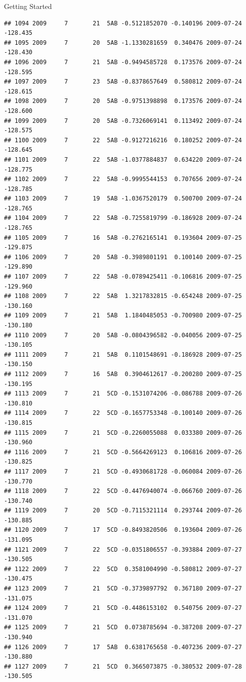 \documentclass[
  ignorenonframetext,
]{beamer}
\begin{document}
\begin{frame}[fragile]{Getting Started}
\begin{verbatim}
## 1094 2009     7       21  5AB -0.5121852070 -0.140196 2009-07-24 -128.435
## 1095 2009     7       20  5AB -1.1330281659  0.340476 2009-07-24 -128.430
## 1096 2009     7       21  5AB -0.9494585728  0.173576 2009-07-24 -128.595
## 1097 2009     7       23  5AB -0.8378657649  0.580812 2009-07-24 -128.615
## 1098 2009     7       20  5AB -0.9751398898  0.173576 2009-07-24 -128.600
## 1099 2009     7       20  5AB -0.7326069141  0.113492 2009-07-24 -128.575
## 1100 2009     7       22  5AB -0.9127216216  0.180252 2009-07-24 -128.645
## 1101 2009     7       22  5AB -1.0377884837  0.634220 2009-07-24 -128.775
## 1102 2009     7       22  5AB -0.9995544153  0.707656 2009-07-24 -128.785
## 1103 2009     7       19  5AB -1.0367520179  0.500700 2009-07-24 -128.765
## 1104 2009     7       22  5AB -0.7255819799 -0.186928 2009-07-24 -128.765
## 1105 2009     7       16  5AB -0.2762165141  0.193604 2009-07-25 -129.875
## 1106 2009     7       20  5AB -0.3989801191  0.100140 2009-07-25 -129.890
## 1107 2009     7       22  5AB -0.0789425411 -0.106816 2009-07-25 -129.960
## 1108 2009     7       22  5AB  1.3217832815 -0.654248 2009-07-25 -130.160
## 1109 2009     7       21  5AB  1.1840485053 -0.700980 2009-07-25 -130.180
## 1110 2009     7       20  5AB -0.0804396582 -0.040056 2009-07-25 -130.105
## 1111 2009     7       21  5AB  0.1101548691 -0.186928 2009-07-25 -130.150
## 1112 2009     7       16  5AB  0.3904612617 -0.200280 2009-07-25 -130.195
## 1113 2009     7       21  5CD -0.1531074206 -0.086788 2009-07-26 -130.810
## 1114 2009     7       22  5CD -0.1657753348 -0.100140 2009-07-26 -130.815
## 1115 2009     7       21  5CD -0.2260055088  0.033380 2009-07-26 -130.960
## 1116 2009     7       21  5CD -0.5664269123  0.106816 2009-07-26 -130.825
## 1117 2009     7       21  5CD -0.4930681728 -0.060084 2009-07-26 -130.770
## 1118 2009     7       22  5CD -0.4476940074 -0.066760 2009-07-26 -130.740
## 1119 2009     7       20  5CD -0.7115321114  0.293744 2009-07-26 -130.885
## 1120 2009     7       17  5CD -0.8493820506  0.193604 2009-07-26 -131.095
## 1121 2009     7       22  5CD -0.0351806557 -0.393884 2009-07-27 -130.505
## 1122 2009     7       22  5CD  0.3581004990 -0.580812 2009-07-27 -130.475
## 1123 2009     7       21  5CD -0.3739897792  0.367180 2009-07-27 -131.075
## 1124 2009     7       21  5CD -0.4486153102  0.540756 2009-07-27 -131.070
## 1125 2009     7       21  5CD  0.0738785694 -0.387208 2009-07-27 -130.940
## 1126 2009     7       17  5AB  0.6381765658 -0.407236 2009-07-27 -130.880
## 1127 2009     7       21  5CD  0.3665073875 -0.380532 2009-07-28 -130.505

\end{verbatim}
\end{frame}
\end{document}
